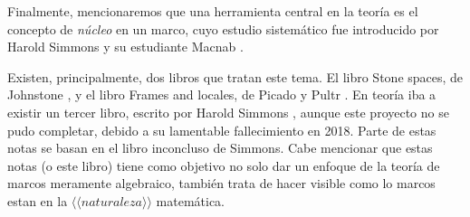 Finalmente, mencionaremos que una herramienta central
en la teoría es el concepto de \emph{núcleo} en un marco,
cuyo estudio sistemático fue introducido por Harold Simmons \cite{simmons1978framework}
y su estudiante Macnab \cite{macnab198110}.

Existen, principalmente, dos libros que tratan este tema.
El libro Stone spaces, de Johnstone \cite{johnstone1986stone},
y el libro Frames and locales, de Picado y Pultr \cite{PicadoPultr}.
En teoría iba a existir un tercer libro, escrito por Harold Simmons ,
aunque este proyecto no se pudo completar, debido a su
lamentable fallecimiento en 2018.
Parte de estas notas se basan en el libro inconcluso de Simmons. 
Cabe mencionar que estas notas (o este libro) tiene como objetivo no solo dar un enfoque de la teoría de marcos meramente algebraico, también trata de hacer visible como lo marcos 
estan en la $\langle \langle naturaleza \rangle \rangle$ matemática. 


%
%
